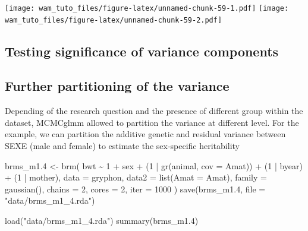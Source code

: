 \documentclass[
  12pt,
]{book}
\newenvironment{Shaded}{\begin{snugshade}}{\end{snugshade}}
\newcommand{\AttributeTok}[1]{\textcolor[rgb]{0.77,0.63,0.00}{#1}}
\newcommand{\DecValTok}[1]{\textcolor[rgb]{0.00,0.00,0.81}{#1}}
\newcommand{\FloatTok}[1]{\textcolor[rgb]{0.00,0.00,0.81}{#1}}
\newcommand{\FunctionTok}[1]{\textcolor[rgb]{0.00,0.00,0.00}{#1}}
\newcommand{\NormalTok}[1]{#1}
\newcommand{\OtherTok}[1]{\textcolor[rgb]{0.56,0.35,0.01}{#1}}
\newcommand{\SpecialCharTok}[1]{\textcolor[rgb]{0.00,0.00,0.00}{#1}}
\newcommand{\StringTok}[1]{\textcolor[rgb]{0.31,0.60,0.02}{#1}}
\begin{document}
\texttt{[image: wam\_tuto\_files/figure-latex/unnamed-chunk-59-1.pdf]} \texttt{[image: wam\_tuto\_files/figure-latex/unnamed-chunk-59-2.pdf]}

\hypertarget{testing-significance-of-variance-components-1}{%
\subsection{Testing significance of variance components}\label{testing-significance-of-variance-components-1}}

\hypertarget{further-partitioning-of-the-variance}{%
\subsection{Further partitioning of the variance}\label{further-partitioning-of-the-variance}}

Depending of the research question and the presence of different group within the dataset, MCMCglmm allowed to partition the variance at different level. For the example, we can partition the additive genetic and residual variance between SEXE (male and female) to estimate the sex-specific heritability

\begin{Shaded}
\begin{Highlighting}[]
\NormalTok{brms\_m1}\FloatTok{.4} \OtherTok{\textless{}{-}} \FunctionTok{brm}\NormalTok{(}
\NormalTok{  bwt }\SpecialCharTok{\textasciitilde{}} \DecValTok{1} \SpecialCharTok{+}\NormalTok{ sex }\SpecialCharTok{+}\NormalTok{ (}\DecValTok{1} \SpecialCharTok{|} \FunctionTok{gr}\NormalTok{(animal, }\AttributeTok{cov =}\NormalTok{ Amat)) }\SpecialCharTok{+}\NormalTok{ (}\DecValTok{1} \SpecialCharTok{|}\NormalTok{ byear) }\SpecialCharTok{+}\NormalTok{ (}\DecValTok{1} \SpecialCharTok{|}\NormalTok{ mother),}
  \AttributeTok{data =}\NormalTok{ gryphon,}
  \AttributeTok{data2 =} \FunctionTok{list}\NormalTok{(}\AttributeTok{Amat =}\NormalTok{ Amat),}
  \AttributeTok{family =} \FunctionTok{gaussian}\NormalTok{(),}
  \AttributeTok{chains =} \DecValTok{2}\NormalTok{, }\AttributeTok{cores =} \DecValTok{2}\NormalTok{, }\AttributeTok{iter =} \DecValTok{1000}
\NormalTok{)}
\FunctionTok{save}\NormalTok{(brms\_m1}\FloatTok{.4}\NormalTok{, }\AttributeTok{file =} \StringTok{"data/brms\_m1\_4.rda"}\NormalTok{)}
\end{Highlighting}
\end{Shaded}

\begin{Shaded}
\begin{Highlighting}[]
\FunctionTok{load}\NormalTok{(}\StringTok{"data/brms\_m1\_4.rda"}\NormalTok{)}
\FunctionTok{summary}\NormalTok{(brms\_m1}\FloatTok{.4}\NormalTok{)}
\end{Highlighting}
\end{Shaded}
\end{document}
